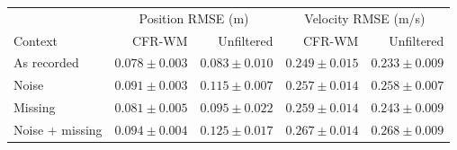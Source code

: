 \begin{tabular}{lrrrr}
\toprule
& \multicolumn{2}{c}{Position RMSE (m)} & \multicolumn{2}{c}{Velocity RMSE (m/s)} \\
Context & CFR-WM & Unfiltered & CFR-WM & Unfiltered \\
\midrule
As recorded & $0.078 \pm 0.003$ & $0.083 \pm 0.010$ & $0.249 \pm 0.015$ & $0.233 \pm 0.009$ \\
Noise & $0.091 \pm 0.003$ & $0.115 \pm 0.007$ & $0.257 \pm 0.014$ & $0.258 \pm 0.007$ \\
Missing & $0.081 \pm 0.005$ & $0.095 \pm 0.022$ & $0.259 \pm 0.014$ & $0.243 \pm 0.009$ \\
Noise + missing & $0.094 \pm 0.004$ & $0.125 \pm 0.017$ & $0.267 \pm 0.014$ & $0.268 \pm 0.009$ \\
\bottomrule
\end{tabular}
